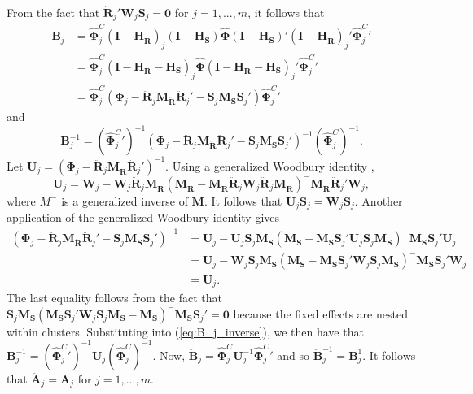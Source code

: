\documentclass[12pt]{article}
\newcommand{\bm}{\mathbf}
\newcommand{\bs}{\boldsymbol}
\begin{document}
From the fact that $\bm{\ddot{R}}_j'\bm{W}_j\bm{S}_j = \bm{0}$ for $j = 1,...,m$, it follows that \begin{align*}
\bm{B}_j &= \bs{\hat\Phi}_j^C \left(\bm{I} - \bm{H_{\ddot{R}}}\right)_j \left(\bm{I} - \bm{H_S}\right) \hat{\bs\Phi} \left(\bm{I} - \bm{H_S}\right)' \left(\bm{I} - \bm{H_{\ddot{R}}}\right)_j' {\bs{\hat\Phi}_j^C}'\\
&= \bs{\hat\Phi}_j^C\left(\bm{I} - \bm{H_{\ddot{R}}} - \bm{H_S}\right)_j \hat{\bs\Phi} \left(\bm{I} - \bm{H_{\ddot{R}}} - \bm{H_S}\right)_j' {\bs{\hat\Phi}_j^C}' \\
&= \bs{\hat\Phi}_j^C \left(\bs\Phi_j - \bm{\ddot{R}}_j \bm{M_{\ddot{R}}}\bm{\ddot{R}}_j' - \bm{S}_j \bm{M_S}\bm{S}_j'\right){\bs{\hat\Phi}_j^C}'
\end{align*}
and 
\begin{equation}
\label{eq:B_j_inverse}
\bm{B}_j^{-1} = \left({\bs{\hat\Phi}_j^C}'\right)^{-1} \left(\bs\Phi_j - \bm{\ddot{R}}_j \bm{M_{\ddot{R}}}\bm{\ddot{R}}_j' - \bm{S}_j \bm{M_S}\bm{S}_j'\right)^{-1}\left(\bs{\hat\Phi}_j^C\right)^{-1}.
\end{equation}
Let $\bm{U}_j = \left(\bs\Phi_j - \bm{\ddot{R}}_j \bm{M_{\ddot{R}}}\bm{\ddot{R}}_j'\right)^{-1}$.
Using a generalized Woodbury identity \citep{Henderson1981on}, \[
\bm{U}_j = \bm{W}_j - \bm{W}_j \bm{\ddot{R}}_j \bm{M_{\ddot{R}}}\left(\bm{M_{\ddot{R}}} - \bm{M_{\ddot{R}}} \bm{\ddot{R}}_j \bm{W}_j \bm{\ddot{R}}_j \bm{M_{\ddot{R}}}\right)^{-} \bm{M_{\ddot{R}}}\bm{\ddot{R}}_j'\bm{W}_j, \]
where ${M}^{-}$ is a generalized inverse of $\bm{M}$. 
It follows that $\bm{U}_j \bm{S}_j = \bm{W}_j \bm{S}_j$. 
Another application of the generalized Woodbury identity gives 
\begin{align*}
\left(\bs\Phi_j - \bm{\ddot{R}}_j \bm{M_{\ddot{R}}}\bm{\ddot{R}}_j' - \bm{S}_j \bm{M_S}\bm{S}_j'\right)^{-1} &= \bm{U}_j - \bm{U}_j \bm{S}_j \bm{M_S}\left(\bm{M_S} - \bm{M_S}\bm{S}_j' \bm{U}_j \bm{S}_j\bm{M_S}\right)^{-} \bm{M_S} \bm{S}_j' \bm{U}_j \\
&= \bm{U}_j - \bm{W}_j \bm{S}_j \bm{M_S}\left(\bm{M_S} - \bm{M_S}\bm{S}_j' \bm{W}_j \bm{S}_j\bm{M_S}\right)^{-} \bm{M_S} \bm{S}_j' \bm{W}_j \\
&= \bm{U}_j.
\end{align*}
The last equality follows from the fact that $\bm{S}_j \bm{M_S}\left(\bm{M_S}\bm{S}_j' \bm{W}_j \bm{S}_j\bm{M_S} - \bm{M_S}\right)^{-} \bm{M_S} \bm{S}_j' = \bm{0}$ because the fixed effects are nested within clusters. 
Substituting into (\ref{eq:B_j_inverse}), we then have that $\bm{B}_j^{-1} = \left({\bs{\hat\Phi}_j^C}'\right)^{-1} \bm{U}_j \left(\bs{\hat\Phi}_j^C\right)^{-1}$. 
Now, $\bm{\ddot{B}}_j = \hat{\bs\Phi}_j^C \bm{U}_j^{-1} {\bs{\hat\Phi}_j^C}'$ and so $\bm{\ddot{B}}_j^{-1} = \bm{B}_j^{1}$. It follows that $\bm{\ddot{A}}_j = \bm{A}_j$ for $j = 1,...,m$. 





\end{document}
